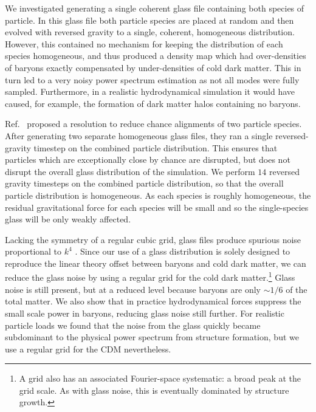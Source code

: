 \documentclass[a4paper,11pt]{article}
\newcommand{\YF}[1]{\textcolor{green}{[\bf YF: #1]} }
\begin{document}
We investigated generating a single coherent glass file containing both species of particle. In this glass file both particle species are placed at random and then evolved with reversed gravity to a single, coherent, homogeneous distribution. However, this contained no mechanism for keeping the distribution of each species homogeneous, and thus produced a density map which had over-densities of baryons exactly compensated by under-densities of cold dark matter. This in turn led to a very noisy power spectrum estimation as not all modes were fully sampled. Furthermore, in a realistic hydrodynamical simulation it would have caused, for example, the formation of dark matter halos containing no baryons.

Ref.~\cite{Yoshida:2003} proposed a resolution to reduce chance alignments of two particle species. After generating two separate homogeneous glass files, they ran a single reversed-gravity timestep on the combined particle distribution. This ensures that particles which are exceptionally close by chance are disrupted, but does not disrupt the overall glass distribution of the simulation. We perform $14$ reversed gravity timesteps on the combined particle distribution, so that the overall particle distribution is homogeneous. As each species is roughly homogeneous, the residual gravitational force for each species will be small and so the single-species glass will be only weakly affected.

Lacking the symmetry of a regular cubic grid, glass files produce spurious noise proportional to $k^4$ \cite{Peebles:1993}. Since our use of a glass distribution is solely designed to reproduce the linear theory offset between baryons and cold dark matter, we can reduce the glass noise by using a regular grid for the cold dark matter.\footnote{A grid also has an associated Fourier-space systematic: a broad peak at the grid scale. As with glass noise, this is eventually dominated by structure growth.} Glass noise is still present, but at a reduced level because baryons are only $\sim 1/6$ of the total matter. We also show that in practice hydrodynamical forces suppress the small scale power in baryons, reducing glass noise still further. For realistic particle loads we found that the noise from the glass quickly became subdominant to the physical power spectrum from structure formation, but we use a regular grid for the CDM nevertheless.

\end{document}
